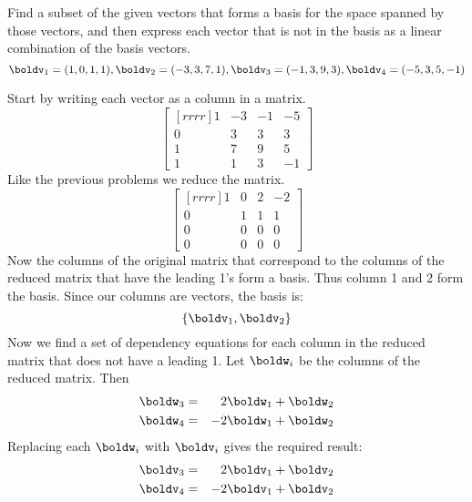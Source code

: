 \ii Find a subset of the given vectors that forms a basis for the space spanned by those vectors, and then express each vector that is not in the basis as a linear combination of the basis vectors.
$$
\boldv_1 = (1,0,1,1), \boldv_2 = (-3,3,7,1), \boldv_3 = (-1,3,9,3), \boldv_4 = (-5,3,5,-1)
$$
\begin{solution}
Start by writing each vector as a column in a matrix.
$$
\begin{bmatrix}[rrrr]
1&-3&-1&-5\\
0&3&3&3\\
1&7&9&5\\
1&1&3&-1
\end{bmatrix}
$$
Like the previous problems we reduce the matrix.
$$
\begin{bmatrix}[rrrr]
1&0&2&-2\\
0&1&1&1\\
0&0&0&0\\
0&0&0&0
\end{bmatrix}
$$
Now the columns of the original matrix that correspond to the columns of the reduced matrix that have the leading 1's form a basis. Thus column 1 and 2 form the basis. Since our columns are vectors, the basis is: $$\{\boldv_1,\boldv_2\}$$
Now we find a set of dependency equations for each column in the reduced matrix that does not have a leading 1. Let $\boldw_i$ be the columns of the reduced matrix. Then
\begin{eqnarray*}
\boldw_3 &=& 2\boldw_1 + \boldw_2\\
\boldw_4 &=& -2\boldw_1 + \boldw_2
\end{eqnarray*}
Replacing each $\boldw_i$ with $\boldv_i$ gives the required result:
\begin{eqnarray*}
\boldv_3 &=& 2\boldv_1 + \boldv_2\\
\boldv_4 &=& -2\boldv_1 + \boldv_2
\end{eqnarray*}
\end{solution}

